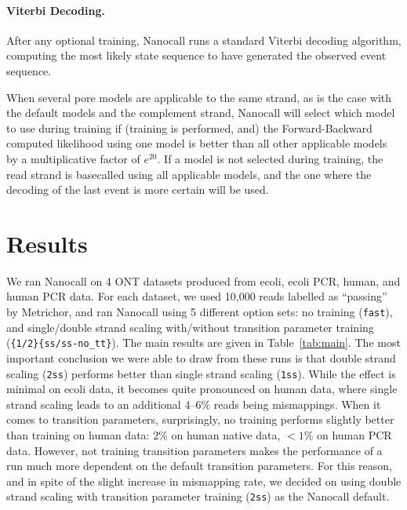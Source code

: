 \documentclass{bioinfo}
\begin{document}
\begin{methods}
\paragraph{Viterbi Decoding.}
After any optional training, Nanocall runs a standard Viterbi decoding algorithm, computing the most likely state sequence to have generated the observed event sequence.

When several pore models are applicable to the same strand, as is the case with the default models and the complement strand, Nanocall will select which model to use during training if (training is performed, and) the Forward-Backward computed likelihood using one model is better than all other applicable models by a multiplicative factor of $e^{20}$. If a model is not selected during training, the read strand is basecalled using all applicable models, and the one where the decoding of the last event is more certain will be used.

\end{methods}

\section{Results}

We ran Nanocall on 4 ONT datasets produced from ecoli, ecoli PCR, human, and human PCR data. For each dataset, we used 10,000 reads labelled as ``passing'' by Metrichor, and ran Nanocall using 5 different option sets: no training (\texttt{fast}), and single/double strand scaling with/without transition parameter training (\texttt{\{1/2\}\{ss/ss-no\_tt\}}). The main results are given in Table~\ref{tab:main}. The most important conclusion we were able to draw from these runs is that double strand scaling (\texttt{2ss}) performs better than single strand scaling (\texttt{1ss}). While the effect is minimal on ecoli data, it becomes quite pronounced on human data, where single strand scaling leads to an additional 4--6$\%$ reads being mismappings. When it comes to transition parameters, surprisingly, no training performs slightly better than training on human data: $2\%$ on human native data, $<1\%$ on human PCR data. However, not training transition parameters makes the performance of a run much more dependent on the default transition parameters. For this reason, and in spite of the slight increase in mismapping rate, we decided on using double strand scaling with transition parameter training (\texttt{2ss}) as the Nanocall default.
\end{document}
